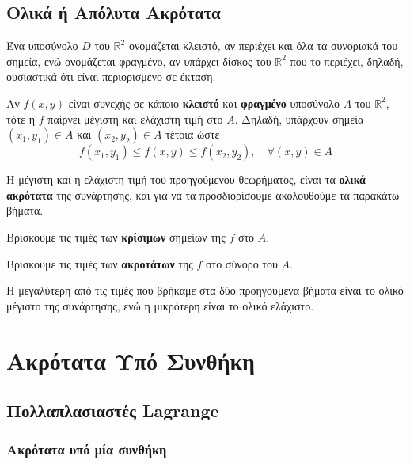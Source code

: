 \documentclass[a4paper,table]{report}
\begin{document}
\section{Ολικά ή Απόλυτα Ακρότατα}

Ένα υποσύνολο $D$ του $ \mathbb{R}^{2} $ ονομάζεται \textcolor{Col1}{κλειστό}, αν 
περιέχει και όλα τα συνοριακά του σημεία, ενώ ονομάζεται \textcolor{Col1}{φραγμένο}, αν 
υπάρχει δίσκος του $ \mathbb{R}^{2} $ που το περιέχει, δηλαδή, ουσιαστικά ότι είναι 
περιορισμένο σε έκταση.

\begin{thm}
  Αν $f(x,y)$ είναι συνεχής σε κάποιο \textbf{κλειστό} και \textbf{φραγμένο} υποσύνολο 
  $A$ του $ \mathbb{R}^{2} $, τότε η $f$ παίρνει μέγιστη και ελάχιστη τιμή στο $A$. 
  Δηλαδή, υπάρχουν σημεία $ (x_{1}, y_{1}) \in A $ και $ (x_{2}, y_{2}) \in A $ τέτοια 
  ώστε 
  \[
    f(x_{1}, y_{1}) \leq f(x,y) \leq f(x_{2}, y_{2}), \quad \forall (x,y) \in A
  \]
\end{thm}

Η μέγιστη και η ελάχιστη τιμή του προηγούμενου θεωρήματος, είναι τα \textbf{ολικά
ακρότατα} της συνάρτησης, και για να τα προσδιορίσουμε ακολουθούμε τα παρακάτω βήματα.

\begin{myitemize}
  \item Βρίσκουμε τις τιμές των \textbf{κρίσιμων} σημείων της $f$ στο $A$.
  \item Βρίσκουμε τις τιμές των \textbf{ακροτάτων} της $f$ στο σύνορο του $A$. 
  \item Η μεγαλύτερη από τις τιμές που βρήκαμε στα δύο προηγούμενα βήματα 
    είναι το ολικό μέγιστο της συνάρτησης, ενώ η μικρότερη είναι το ολικό ελάχιστο.
\end{myitemize}






\chapter{Ακρότατα Υπό Συνθήκη}

\section{Πολλαπλασιαστές Lagrange}

\subsection{Ακρότατα υπό μία συνθήκη}
\end{document}
